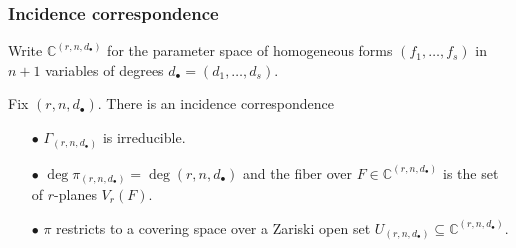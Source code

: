 \documentclass{beamer}
\theoremstyle{definition}
\begin{document}
\begin{frame}
\frametitle{Incidence correspondence}
Write $\mathbb{C}^{(r,n,d_\bullet)}$ for the parameter space of homogeneous forms $(f_1,\dotsc,f_s)$ in $n+1$ variables of degrees $d_\bullet = (d_1,\dotsc,d_s)$.

Fix $(r,n,d_\bullet)$. There is an incidence correspondence

\vspace{-.3cm}

\begin{center}
\end{center}

\vspace{-.45cm}

\begin{enumerate}
\item[$\bullet$] $\Gamma_{(r,n,d_\bullet)}$ is irreducible.

\item[$\bullet$] $\deg \pi_{(r,n,d_\bullet)} = \deg(r,n,d_\bullet)$ and the fiber over $F\in\mathbb{C}^{(r,n,d_\bullet)}$ is the set of $r$-planes $V_r(F)$.

\item[$\bullet$] $\pi$ restricts to a covering space over a Zariski open set $U_{(r,n,d_\bullet)}\subseteq\mathbb{C}^{(r,n,d_\bullet)}$.

\end{enumerate}
\end{frame}
\end{document}

